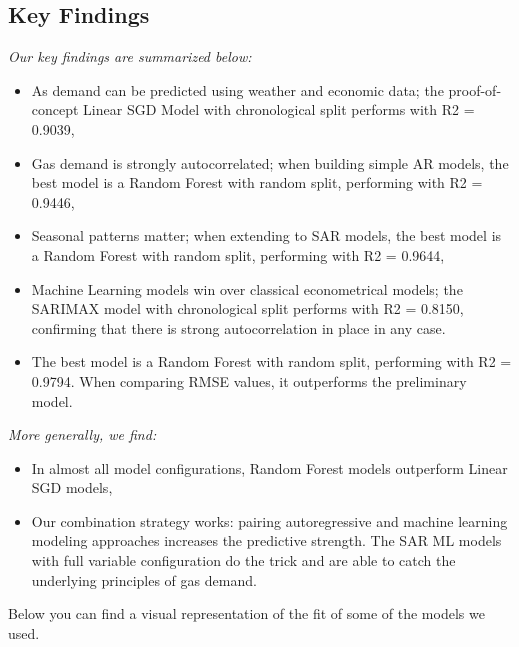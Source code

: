 \documentclass[
]{article}
\providecommand{\tightlist}{%
  \setlength{\itemsep}{0pt}\setlength{\parskip}{0pt}}
\begin{document}
\hypertarget{key-findings}{%
\subsection{Key Findings}\label{key-findings}}

\emph{Our key findings are summarized below:}

\begin{itemize}
\tightlist
\item
  As demand can be predicted using weather and economic data; the
  proof-of-concept Linear SGD Model with chronological split performs
  with R2 = 0.9039,
\item
  Gas demand is strongly autocorrelated; when building simple AR models,
  the best model is a Random Forest with random split, performing with
  R2 = 0.9446,
\item
  Seasonal patterns matter; when extending to SAR models, the best model
  is a Random Forest with random split, performing with R2 = 0.9644,
\item
  Machine Learning models win over classical econometrical models; the
  SARIMAX model with chronological split performs with R2 = 0.8150,
  confirming that there is strong autocorrelation in place in any case.
\item
  The best model is a Random Forest with random split, performing with
  R2 = 0.9794. When comparing RMSE values, it outperforms the
  preliminary model.
\end{itemize}

\emph{More generally, we find:}

\begin{itemize}
\tightlist
\item
  In almost all model configurations, Random Forest models outperform
  Linear SGD models,
\item
  Our combination strategy works: pairing autoregressive and machine
  learning modeling approaches increases the predictive strength. The
  SAR ML models with full variable configuration do the trick and are
  able to catch the underlying principles of gas demand.
\end{itemize}

Below you can find a visual representation of the fit of some of the
models we used.
\end{document}
